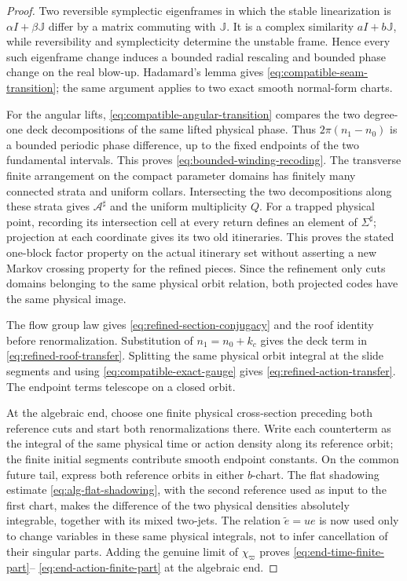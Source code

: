 \documentclass[11pt]{amsart}
\numberwithin{equation}{section}
\theoremstyle{definition}
\theoremstyle{remark}
\newcommand{\J}{\mathbb J}
\begin{document}
\begin{proof}
Two reversible symplectic eigenframes in which the stable linearization is
$\alpha I+\beta\J$ differ by a matrix commuting with $\J$.  It is a
complex similarity $aI+b\J$, while reversibility and symplecticity
determine the unstable frame.  Hence every such eigenframe change induces
a bounded radial rescaling and bounded phase change on the real blow-up.
Hadamard's lemma gives \eqref{eq:compatible-seam-transition}; the same
argument applies to two exact smooth normal-form charts.

For the angular lifts, \eqref{eq:compatible-angular-transition} compares
the two degree-one deck decompositions of the same lifted physical phase.
Thus $2\pi(n_1-n_0)$ is a bounded periodic phase difference, up to the
fixed endpoints of the two fundamental intervals.  This proves
\eqref{eq:bounded-winding-recoding}.  The transverse finite arrangement on
the compact parameter domains has finitely many connected strata and
uniform collars.  Intersecting the two decompositions along these strata
gives $\mathcal A^\sharp$ and the uniform multiplicity $Q$.  For a trapped
physical point, recording its intersection cell at every return defines an
element of $\Sigma^\sharp$; projection at each coordinate gives its two old
itineraries.  This proves the stated one-block factor property on the
actual itinerary set without asserting a new Markov crossing property for
the refined pieces.  Since the refinement only cuts domains belonging to
the same physical orbit relation, both projected codes have the same
physical image.

The flow group law gives \eqref{eq:refined-section-conjugacy} and the roof
identity before renormalization.  Substitution of
$n_1=n_0+k_c$ gives the deck term in
\eqref{eq:refined-roof-transfer}.  Splitting the same physical orbit
integral at the slide segments and using
\eqref{eq:compatible-exact-gauge} gives
\eqref{eq:refined-action-transfer}.  The endpoint terms telescope on a
closed orbit.

At the algebraic end, choose one finite physical cross-section preceding
both reference cuts and start both renormalizations there.  Write each
counterterm as the integral of the same physical time or action density
along its reference orbit; the finite initial segments contribute smooth
endpoint constants.  On the common future tail, express both reference
orbits in either $b$-chart.  The flat shadowing estimate
\eqref{eq:alg-flat-shadowing}, with the second reference used as input to
the first chart, makes the difference of the two physical densities
absolutely integrable, together with its mixed two-jets.  The relation
$\widetilde e=ue$ is now used only to change variables in these same
physical integrals, not to infer cancellation of their singular parts.
Adding the genuine limit of $\chi_\varpi$ proves
\eqref{eq:end-time-finite-part}--
\eqref{eq:end-action-finite-part} at the algebraic end.


\end{proof}
\end{document}
